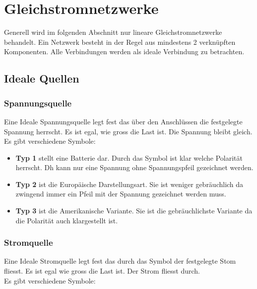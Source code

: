 \section{Gleichstromnetzwerke}

Generell wird im folgenden Abschnitt nur lineare Gleichstromnetzwerke behandelt. 
Ein Netzwerk besteht in der Regel aus mindestens 2 verknüpften Komponenten. 
Alle Verbindungen werden als ideale Verbindung zu betrachten.

\subsection{Ideale Quellen}

\subsubsection{Spannungsquelle}

Eine Ideale Spannungsquelle legt fest das über den Anschlüssen die festgelegte Spannung herrscht. 
Es ist egal, wie gross die Last ist. 
Die Spannung bleibt gleich.\\
Es gibt verschiedene Symbole:\\
\begin{center}
    
    \begin{itemize}
        \item \textbf{Typ 1} stellt eine Batterie dar. Durch das Symbol ist klar welche Polarität herrscht. Dh kann nur eine Spannung ohne Spannungspfeil gezeichnet werden.
        \item \textbf{Typ 2} ist die Europäische Darstellungsart. Sie ist weniger gebräuchlich da zwingend immer ein Pfeil mit der Spannung gezeichnet werden muss.
        \item \textbf{Typ 3} ist die Amerikanische Variante. Sie ist die gebräuchlichste Variante da die Polarität auch klargestellt ist.
    \end{itemize}
\end{center}

\subsubsection{Stromquelle}

Eine Ideale Stromquelle legt fest das durch das Symbol der festgelegte Stom fliesst. 
Es ist egal wie gross die Last ist. 
Der Strom fliesst durch.\\
Es gibt verschiedene Symbole:\\
\begin{center}
    
\end{center}

